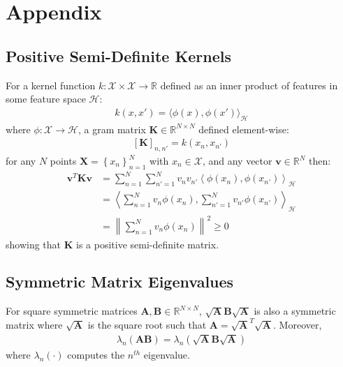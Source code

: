 \documentclass{article}
\numberwithin{equation}{section}
\begin{document}
\newpage



\newpage
\appendix
{}

\section{Appendix}

\subsection{Positive Semi-Definite Kernels} \label{appendix:positive-definite-kernel}
For a kernel function $k: \mathcal{X} \times \mathcal{X} \rightarrow \mathbb{R}$ defined as an inner product of features in some feature space $\mathcal{H}$:
\begin{align}
    k(x, x') = \langle \phi(x), \phi(x') \rangle_{\mathcal{H}}
\end{align}
where $\phi: \mathcal{X} \rightarrow \mathcal{H}$, a gram matrix $\mathbf{K} \in \mathbb{R}^{N\times N}$ defined element-wise:
\begin{align}
    \left[\mathbf{K}\right]_{n, n'} = k(x_n, x_{n'})
\end{align}
for any $N$ points $\mathbf{X} = \left\{x_n\right\}_{n=1}^N$ with $x_n \in \mathcal{X}$, and any vector $\mathbf{v} \in \mathbb{R}^N$ then:
\begin{align}
    \mathbf{v}^T \mathbf{K} \mathbf{v} &= \sum_{n=1}^N\sum_{n'=1}^N v_n v_{n'}  \left\langle \phi(x_n), \phi(x_{n'}) \right\rangle_{\mathcal{H}} \\
    &= \left\langle\sum_{n=1}^N v_n \phi(x_n), \sum_{n'=1}^N  v_{n'}\phi(x_{n'}) \right\rangle_{\mathcal{H}} \\
    &= \left\| \sum_{n=1}^N v_n \phi(x_n) \right\|^2 \geq 0
\end{align}
showing that $\mathbf{K}$ is a positive semi-definite matrix.

\newpage
\subsection{Symmetric Matrix Eigenvalues}\label{appendix:eigenvalue-symmetric-matrix}
For square symmetric matrices $\mathbf{A}, \mathbf{B} \in \mathbb{R}^{N \times N}$, $\sqrt{\mathbf{A}}\mathbf{B}\sqrt{\mathbf{A}}$ is also a symmetric matrix where $\sqrt{\mathbf{A}}$ is the square root such that $\mathbf{A} = \sqrt{\mathbf{A}}^T \sqrt{\mathbf{A}}$. Moreover,
\begin{align}
    \lambda_{n} \left(\mathbf{A} \mathbf{B}\right) = \lambda_{n} \left(\sqrt{\mathbf{A}}\mathbf{B}\sqrt{\mathbf{A}}\right)
\end{align}
where $\lambda_{n}(\cdot)$ computes the $n^{th}$ eigenvalue.
\end{document}
